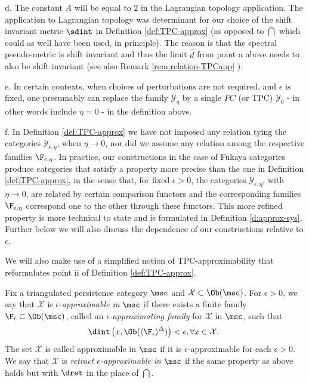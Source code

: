 \begin{rem}
  d. The constant $A$
  will be equal to $2$ in the Lagrangian topology application. The  application to Lagrangian topology was determinant for our choice of the shift invariant
 metric $\sdint$ in Definition \ref{def:TPC-approx} (as opposed to
  $\dint$ which could as well have been used, in principle). The
  reason is that the spectral pseudo-metric is shift invariant and
  thus the limit $\hat{d}$ from point a above needs to also be shift
  invariant (see also Remark \ref{rem:relation-TPCapp} ).

  e. In certain contexts, when choices of perturbations are not
  required, and $\epsilon$ is fixed, one presumably can replace the family $\mathscr{Y}_{\eta}$ by a single $PC$ (or TPC) $\mathscr{Y}_{ 0}$ - in other words include
  $\eta=0$ - in the definition above.

  f. In Definition \ref{def:TPC-approx} we have not imposed any
  relation tying the categories $\mathscr{Y}_{\epsilon,\eta}$, when
  $\eta \to 0$, nor did we assume any relation among the respective
  families $\F_{\epsilon,\eta}$.  In practice, our constructions in
  the case of Fukaya categories produce categories that satisfy a
  property more precise than the one in Definition
  \ref{def:TPC-approx}, in the sense that, for fixed $\epsilon >0$, the
  categories $\mathscr{Y}_{\epsilon,\eta}$, with $\eta\to 0$, are related by
  certain comparison functors and the corresponding families
  $\F_{\epsilon,\eta}$ correspond one to the other through these
  functors. This more refined property is more technical to state and
  is formulated in Definition \ref{d:approx-sys}. Further below we
  will also discuss the dependence of our constructions relative to $\epsilon$.
  
\end{rem}

We will also make use of a simplified notion of TPC-approximability
that reformulates point ii of Definition \ref{def:TPC-approx}.


\begin{dfn} \label{def:simple_approx} Fix a triangulated persistence
  category $\msc$ and $\mathcal{X}\subset \Ob(\msc)$.  For $\epsilon >0$, we say that $\mathcal{X}$ is $\epsilon$-{\em approximable in} $\msc$ if there
  exists a {finite} family $\F_{\epsilon}\subset \Ob(\msc)$, called an
  $\epsilon$-{\em approximating family} for $\mathcal{X}$ in $\msc$, such that
  $$\dint\left( x, \Ob (\langle \F_{\epsilon}\rangle^{\Delta})\right)
  < \epsilon, \forall x \in \mathcal{X}.~$$ The set $\mathcal{X}$ is called approximable
  in $\msc$ if it is $\epsilon$-approximable for each $\epsilon >0$.
 We say that $\mathcal{X}$ is  {\em retract $\epsilon$-approximable in}
 $\msc$ if the same property as above holds but with $\dret$ in the place of $\dint$. 
  \end{dfn} 


